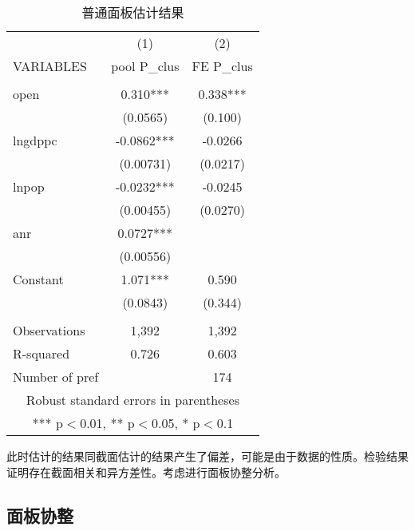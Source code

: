 \documentclass[10pt]{article}
\begin{document}
    \begin{table}
        \begin{center}
            \caption{普通面板估计结果}
            \begin{tabular}{lcc} \hline \hline
                 & (1) & (2) \\
                VARIABLES & pool P\_clus & FE P\_clus \\ \hline
                 &  &  \\
                open & 0.310*** & 0.338*** \\
                 & (0.0565) & (0.100) \\
                lngdppc & -0.0862*** & -0.0266 \\
                 & (0.00731) & (0.0217) \\
                lnpop & -0.0232*** & -0.0245 \\
                 & (0.00455) & (0.0270) \\
                anr & 0.0727*** &  \\
                 & (0.00556) &  \\
                Constant & 1.071*** & 0.590 \\
                 & (0.0843) & (0.344) \\
                 &  &  \\
                Observations & 1,392 & 1,392 \\
                R-squared & 0.726 & 0.603 \\
                 Number of pref &  & 174 \\ \hline \hline
                \multicolumn{3}{c}{ Robust standard errors in parentheses} \\
                \multicolumn{3}{c}{ *** p$<$0.01, ** p$<$0.05, * p$<$0.1} \\
            \end{tabular}
        \end{center}
    \end{table}

    此时估计的结果同截面估计的结果产生了偏差，可能是由于数据的性质。检验结果证明存在截面相关和异方差性。考虑进行面板协整分析。

\subsection{面板协整}
\end{document}
